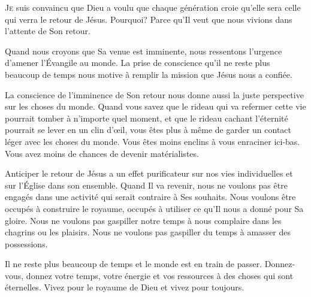 \dvrule








\lettrine{J}{e} suis convaincu
 que Dieu a voulu que chaque génération
 croie qu'elle sera celle qui verra le retour de Jésus.
 Pourquoi? Parce qu'Il veut que nous vivions
 dans l'attente de Son retour.

Quand nous croyons que Sa venue est imminente,
 nous ressentons l'urgence d'amener l'Évangile au monde.
 La prise de conscience qu'il ne reste plus beaucoup
 de temps nous motive à remplir la mission que Jésus nous a confiée. 


La conscience de l'imminence de Son retour nous donne aussi
 la juste perspective sur les choses du monde.
 Quand vous savez que le rideau qui va refermer cette vie
 pourrait tomber à n'importe quel moment,
 et que le rideau cachant l'éternité pourrait se lever en un clin d'\oe{}il,
 vous êtes plus à même de garder un contact léger avec les choses du monde.
 Vous êtes moins enclins à vous enraciner ici-bas.
 Vous avez moins de chances de devenir matérialistes.

Anticiper le retour de Jésus a un effet purificateur
 sur nos vies individuelles et sur l'Église dans son ensemble.
 Quand Il va revenir, nous ne voulons pas être engagés dans une activité
 qui serait contraire à Ses souhaits.
 Nous voulons être occupés à construire le royaume,
 occupés à utiliser ce qu'Il nous a donné pour Sa gloire.
 Nous ne voulons pas gaspiller notre temps à nous complaire
 dans les chagrins ou les plaisirs.
 Nous ne voulons pas gaspiller du temps à amasser des possessions.

Il ne reste plus beaucoup de temps et le monde est en train de passer.
 Donnez-vous, donnez votre temps, votre énergie et vos ressources
 à des choses qui sont éternelles.
 Vivez pour le royaume de Dieu et vivez pour toujours.


